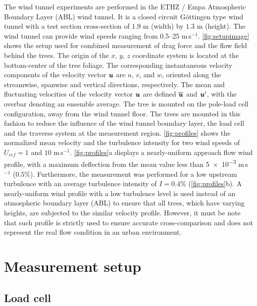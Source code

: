The wind tunnel experiments are performed in the ETHZ / Empa Atmospheric Boundary Layer (ABL) wind tunnel. It is a closed circuit G\"ottingen type wind tunnel with a test section cross-section of $1.9$ m (width) by $1.3$ m (height). The wind tunnel can provide wind speeds ranging from \numrange{0.5}{25} m\,s$^{-1}$. \cref{fig:setupimage} shows the setup used for combined measurement of drag force and the flow field behind the trees. The origin of the $x$, $y$, $z$  coordinate system is located at the bottom-center of the tree foliage. The corresponding instantaneous velocity components of the velocity vector $\textbf{\textit{u}}$ are $u$, $v$, and $w$, oriented along the streamwise, spanwise and vertical directions, respectively. The mean and fluctuating velocities of the velocity vector $\textbf{\textit{u}}$ are defined $\overline{\textbf{\textit{u}}}$ and $\textbf{\textit{u}}'$, with the overbar denoting an ensemble average. The tree is mounted on the pole-load cell configuration, away from the wind tunnel floor. The trees are mounted in this fashion to reduce the influence of the wind tunnel boundary layer, the load cell and the traverse system at the measurement region. \cref{fig:profiles} shows the normalized mean velocity and the turbulence intensity for two wind speeds of $U_{\textit{ref}}=1$ and $10$ m\,s$^{-1}$. \cref{fig:profiles}a displays a nearly-uniform approach flow wind profile, with a maximum deflection from the mean value less than \num{5e-3} m\,s$^{-1}$ ($0.5\%$). Furthermore, the measurement was performed for a low upstream turbulence with an average turbulence intensity of $I=0.4$\% (\cref{fig:profiles}b). A nearly-uniform wind profile with a low turbulence level is used instead of an atmospheric boundary layer (ABL) to ensure that all trees, which have varying heights, are subjected to the similar velocity profile. However, it must be note that such profile is strictly used to ensure accurate cross-comparison and does not represent the real flow condition in an urban environment.




\section{Measurement setup}

\subsection{Load cell}
\label{subsec:loadcell}

